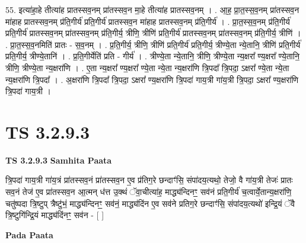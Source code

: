 \documentclass[17pt]{extarticle}
\begin{document}
55. इत्या॑हा॒हे तीत्या॑ह प्रातस्सव॒नम् प्रा॑तस्सव॒न मा॒हे तीत्या॑ह प्रातस्सव॒नम् । . आ॒ह॒ प्रा॒त॒स्स॒व॒नम् प्रा॑तस्सव॒न मा॑हाह प्रातस्सव॒नम् प्र॑ति॒गीर्य॑ प्रति॒गीर्य॑ प्रातस्सव॒न मा॑हाह प्रातस्सव॒नम् प्र॑ति॒गीर्य॑ । . प्रा॒त॒स्स॒व॒नम् प्र॑ति॒गीर्य॑ प्रति॒गीर्य॑ प्रातस्सव॒नम् प्रा॑तस्सव॒नम् प्र॑ति॒गीर्य॒ त्रीणि॒ त्रीणि॑ प्रति॒गीर्य॑ प्रातस्सव॒नम् प्रा॑तस्सव॒नम् प्र॑ति॒गीर्य॒ त्रीणि॑ । . प्रा॒त॒स्स॒व॒नमिति॑ प्रातः - स॒व॒नम् । . प्र॒ति॒गीर्य॒ त्रीणि॒ त्रीणि॑ प्रति॒गीर्य॑ प्रति॒गीर्य॒ त्रीण्ये॒ता न्ये॒तानि॒ त्रीणि॑ प्रति॒गीर्य॑ प्रति॒गीर्य॒ त्रीण्ये॒तानि॑ । . प्र॒ति॒गीर्येति॑ प्रति - गीर्य॑ । . त्रीण्ये॒ता न्ये॒तानि॒ त्रीणि॒ त्रीण्ये॒ता न्य॒क्षरा᳚ ण्य॒क्षरा᳚ ण्ये॒तानि॒ त्रीणि॒ त्रीण्ये॒ता न्य॒क्षरा॑णि । . ए॒ता न्य॒क्षरा᳚ ण्य॒क्षरा᳚ ण्ये॒ता न्ये॒ता न्य॒क्षरा॑णि त्रि॒पदा᳚ त्रि॒पदा॒ ऽक्षरा᳚ ण्ये॒ता न्ये॒ता न्य॒क्षरा॑णि त्रि॒पदा᳚ । . अ॒क्षरा॑णि त्रि॒पदा᳚ त्रि॒पदा॒ ऽक्षरा᳚ ण्य॒क्षरा॑णि त्रि॒पदा॑ गाय॒त्री गा॑य॒त्री 
त्रि॒पदा॒ ऽक्षरा᳚ ण्य॒क्षरा॑णि त्रि॒पदा॑ गाय॒त्री । \newline
\pagebreak
{}

\section{ TS 3.2.9.3 }

\textbf{TS 3.2.9.3 } \newline
\textbf{Samhita Paata} \newline

त्रि॒पदा॑ गाय॒त्री गा॑य॒त्रं प्रा॑तस्सव॒नं प्रा॑तस्सव॒न ए॒व प्र॑तिग॒रे छन्दाꣳ॑सि॒ संपा॑दय॒त्यथो॒ तेजो॒ वै गा॑य॒त्री तेजः॑ प्रातः सव॒नं तेज॑ ए॒व प्रा॑तस्सव॒न आ॒त्मन् ध॑त्त उ॒क्थं ॅवा॒चीत्या॑ह॒ माद्ध्य॑न्दिनꣳ॒॒ सव॑नं प्रति॒गीर्य॑ च॒त्वार्ये॒तान्य॒क्षरा॑णि॒ चतु॑ष्पदा त्रि॒ष्टुप् त्रैष्टु॑भं॒ माद्ध्य॑न्दिनꣳ॒॒ सव॑नं॒ माद्ध्य॑दिंन ए॒व सव॑ने प्रतिग॒रे छन्दाꣳ॑सि॒ संपा॑दय॒त्यथो॑ इन्द्रि॒यं ॅवै त्रि॒ष्टुगि॑न्द्रि॒यं माद्ध्य॑दिंनꣳ॒॒ सव॑न - [  ] \newline

\textbf{Pada Paata} \newline
\end{document}
